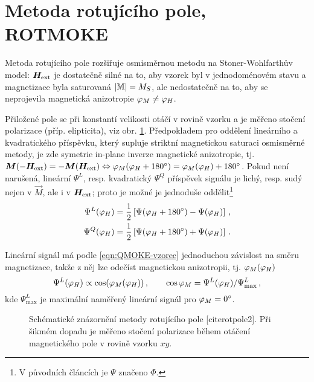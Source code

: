 \section{Metoda rotujícího pole, ROTMOKE}
\label{chap:ROTMOKE}

Metoda rotujícího pole rozšiřuje osmisměrnou metodu na Stoner-Wohlfarthův model: $\bm{H}_\textrm{ext}$ je dostatečně silné na to, aby vzorek byl v jednodoménovém stavu a magnetizace byla saturovaná $|\mathbb{M}|=M_S$, ale nedostatečně na to, aby se neprojevila magnetická anizotropie $\varphi_M\neq\varphi_H$.

Přiložené pole se při konstantí velikosti otáčí v rovině vzorku a je měřeno stočení polarizace (příp. elipticita), viz obr. \ref{fig:metoda-rotujiciho-pole}.
Předpokladem pro oddělení lineárního a kvadratického příspěvku, který supluje striktní magnetickou saturaci osmisměrné metody,
je zde symetrie in-plane inverze magnetické anizotropie, tj. $\bm{M}(-\bm{H}_\textrm{ext})=-\bm{M}(\bm{H}_\textrm{ext}) \Leftrightarrow \varphi_M(\varphi_H+\SI{180}{\degree})=\varphi_M(\varphi_H)+\SI{180}{\degree}$.
Pokud není narušená, lineární $\Psi^L$, resp. kvadratický $\Psi^Q$ příspěvek signálu je lichý, resp. sudý nejen v $\vec{M}$, ale i v $\bm{H}_\textrm{ext}$;
proto je možné je jednoduše oddělit\footnote{V původních článcích je $\Psi$ značeno $\Phi$.}
\begin{align}
    \Psi^L(\varphi_H)&=\frac{1}{2} \left[ \Psi(\varphi_H+\SI{180}{\degree}) - \Psi(\varphi_H) \right] 
    \,, \\ \Psi^Q(\varphi_H)&=\frac{1}{2} \left[ \Psi(\varphi_H+\SI{180}{\degree}) + \Psi(\varphi_H) \right] \,.
\end{align}

Lineární signál má podle \eqref{eqn:QMOKE-vzorec} jednoduchou závislost na směru magnetizace, takže z něj lze odečíst magnetickou anizotropii, tj. $\varphi_M(\varphi_H)$
\begin{equation}
    \Psi^L(\varphi_H)\propto \cos(\varphi_M(\varphi_H)) \,, \qquad \cos \varphi_M=\Psi^L(\varphi_H)/\Psi^L_\textrm{max} \,,
\end{equation}
kde $\Psi^L_\textrm{max}$ je maximální naměřený lineární signál pro $\varphi_M=\SI{0}{\degree}$.

\begin{figure}[htbp]
    \centering
    \caption{Schématické znázornění metody rotujícího pole [cite{rotpole2]}. Při šikmém dopadu je měřeno stočení polarizace během otáčení magnetického pole v rovině vzorku $xy$.}
    \label{fig:metoda-rotujiciho-pole}
\end{figure}

